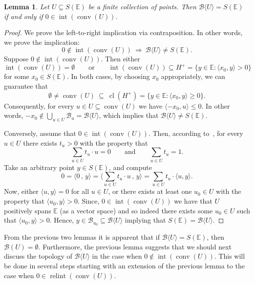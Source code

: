 \documentclass[a4paper,11pt,reqno, english]{amsart}
\newtheorem{lemma}[theorem]{Lemma}
\theoremstyle{definition}
\theoremstyle{remark}
\newcommand\E{\mathbb{E}}
\DeclareMathOperator{\interior}{\mathrm{int}}
\DeclareMathOperator{\relint}{\mathrm{relint}}
\DeclareMathOperator{\conv}{\mathrm{conv}}
\DeclareMathOperator{\cl}{\mathrm{cl}}
\begin{document}
\medskip
\begin{lemma}
	\label{lem : covering of the sphere}
	Let $U\subseteq S(\E)$ be a finite collection of points.
	Then $\mathscr{B}\langle U\rangle =S(\E)$ if and only if $0\in\interior (\conv(U))$.
\end{lemma}
\begin{proof}
	We prove the left-to-right implication via contraposition.
	In other words, we prove the implication:
	\[
		0\notin\interior ( \conv(U) )\ \Longrightarrow \ \mathscr{B}\langle U\rangle\neq S(\E).
	\]
	Suppose $0\notin\interior (\conv(U))$.
	Then either
	\[
		\interior (\conv(U))=\emptyset\qquad\text{or}\qquad \interior(\conv(U))\subseteq H^+=\{ y\in \E : \langle x_0,y\rangle>0\}
	\]
	for some $x_0\in S(\E)$.
	In both cases, by choosing $x_0$ appropriately, we can guarantee that
	\[
		\emptyset\neq \conv(U) \ \subseteq \ \cl (H^+)=\{ y\in \E : \langle x_0,y\rangle\geq 0\}.
	\]
	Consequently, for every $u\in U\subseteq\conv(U)$ we have $\langle -x_0,u\rangle\leq 0$.
	In other words, $-x_0\notin\bigcup_{u\in U}\mathscr{B}_u=\mathscr{B}\langle U\rangle$, which implies that $\mathscr{B}\langle U\rangle\neq S(\E)$.

	\medskip
	Conversely, assume that $0\in\interior ( \conv(U))$.
	Then, according to~\cite[Thm.\,6]{McMullenShephard}, for every $u\in U$ there exists $t_u>0$ with the property that
	\[
		\sum_{u\in U}t_u\cdot u=0
		\qquad\text{and}\qquad
		\sum_{u\in U}t_u =1.
	\]
	Take an arbitrary point $y\in S(\E)$, and compute
	\[
		0=\langle 0\,,\,y\rangle=\big\langle\sum_{u\in U}t_u\cdot u\,,\,y\big\rangle= \sum_{u\in U}t_u\cdot\langle u,y\rangle .
	\]
	Now, either $\langle u,y\rangle=0$ for all $u\in U$, or there exists at least one  $u_0\in U$ with the property that $\langle u_0,y\rangle>0$.
	Since, $0\in\interior (\conv(U))$ we have that $U$ positively spans $\E$ (as a vector space) and so indeed there exists some $u_0\in U$ such that $\langle u_0,y\rangle>0$.
	Hence, $y\in \mathscr{B}_{u_0}\subseteq \mathscr{B}\langle U\rangle$ implying that $S(\E)=\mathscr{B}\langle U\rangle$.
\end{proof}

\medskip
From the previous two lemmas it is apparent that if $\mathscr{B}\langle U\rangle =S(\E)$, then $\mathscr{B}(U)=\emptyset$.
Furthermore, the previous lemma suggests that we should next discuss the topology of $\mathscr{B}\langle U\rangle $ in the case when $0\notin\interior (\conv(U))$.
This will be done in several steps starting with an extension of the previous lemma to the case when $0\in \relint (\conv (U))$.
\end{document}

